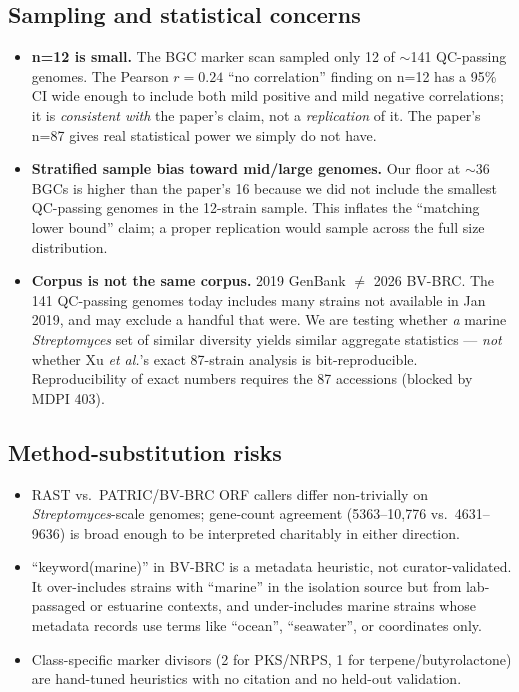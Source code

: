 \documentclass[11pt,letterpaper]{article}
\begin{document}
\subsection{Sampling and statistical concerns}
\begin{itemize}
\item \textbf{n=12 is small.} The BGC marker scan sampled only 12 of $\sim$141 QC-passing genomes. The Pearson $r=0.24$ ``no correlation'' finding on n=12 has a 95\% CI wide enough to include both mild positive and mild negative correlations; it is \emph{consistent with} the paper's claim, not a \emph{replication} of it. The paper's n=87 gives real statistical power we simply do not have.
\item \textbf{Stratified sample bias toward mid/large genomes.} Our floor at $\sim$36 BGCs is higher than the paper's 16 because we did not include the smallest QC-passing genomes in the 12-strain sample. This inflates the ``matching lower bound'' claim; a proper replication would sample across the full size distribution.
\item \textbf{Corpus is not the same corpus.} 2019 GenBank $\neq$ 2026 BV-BRC. The 141 QC-passing genomes today includes many strains not available in Jan 2019, and may exclude a handful that were. We are testing whether \emph{a} marine \textit{Streptomyces} set of similar diversity yields similar aggregate statistics --- \emph{not} whether Xu \textit{et al.}'s exact 87-strain analysis is bit-reproducible. Reproducibility of exact numbers requires the 87 accessions (blocked by MDPI 403).
\end{itemize}

\subsection{Method-substitution risks}
\begin{itemize}
\item RAST vs.\ PATRIC/BV-BRC ORF callers differ non-trivially on \textit{Streptomyces}-scale genomes; gene-count agreement (5363--10{,}776 vs.\ 4631--9636) is broad enough to be interpreted charitably in either direction.
\item ``keyword(marine)'' in BV-BRC is a metadata heuristic, not curator-validated. It over-includes strains with ``marine'' in the isolation source but from lab-passaged or estuarine contexts, and under-includes marine strains whose metadata records use terms like ``ocean'', ``seawater'', or coordinates only.
\item Class-specific marker divisors (2 for PKS/NRPS, 1 for terpene/butyrolactone) are hand-tuned heuristics with no citation and no held-out validation.
\end{itemize}
\end{document}

